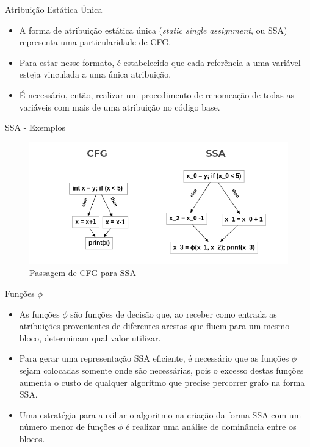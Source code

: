\begin{frame}{Atribuição Estática Única}
    \begin{itemize}
        \item A forma de atribuição estática única (\textit{static single assignment}, ou SSA) representa uma particularidade de CFG.

        \item Para estar nesse formato, é estabelecido que cada referência a uma variável esteja vinculada a uma única atribuição.

        \item É necessário, então, realizar um procedimento de renomeação de todas as variáveis com mais de uma atribuição no código base.
    \end{itemize}
\end{frame}

\begin{frame}{SSA - Exemplos}
    \begin{figure}
        \centering
        \includegraphics[width=.9\textwidth]{Figuras/ssa-cfg.png}
        \caption{Passagem de CFG para SSA}
        \label{fig:cfg-ssa}
    \end{figure}
\end{frame}

\begin{frame}{Funções $\phi$}
    \begin{itemize}
        \item As funções $\phi$ são funções de decisão que, ao receber como entrada as atribuições provenientes de diferentes arestas que fluem para um mesmo bloco, determinam qual valor utilizar.

        \item Para gerar uma representação SSA eficiente, é necessário que as funções $\phi$ sejam colocadas somente onde são necessárias, pois o excesso destas funções aumenta o custo de qualquer algoritmo que precise percorrer grafo na forma SSA.

        \item Uma estratégia para auxiliar o algoritmo na criação da forma SSA com um número menor de funções $\phi$ é realizar uma análise de dominância entre os blocos.
    \end{itemize}
\end{frame}

